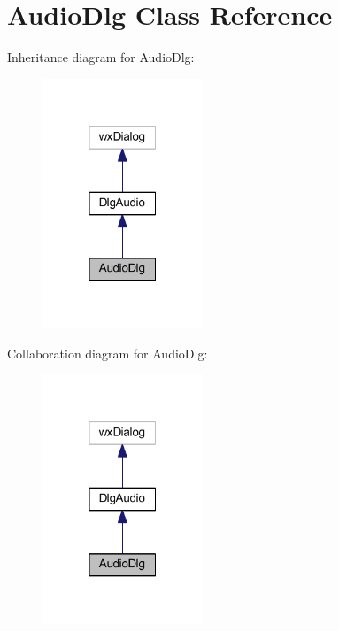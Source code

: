 \hypertarget{class_audio_dlg}{\section{Audio\-Dlg Class Reference}
\label{class_audio_dlg}
}


Inheritance diagram for Audio\-Dlg\-:
\nopagebreak
\begin{figure}[H]
\begin{center}
\leavevmode
\includegraphics[width=136pt]{class_audio_dlg__inherit__graph}
\end{center}
\end{figure}


Collaboration diagram for Audio\-Dlg\-:
\nopagebreak
\begin{figure}[H]
\begin{center}
\leavevmode
\includegraphics[width=136pt]{class_audio_dlg__coll__graph}
\end{center}
\end{figure}
